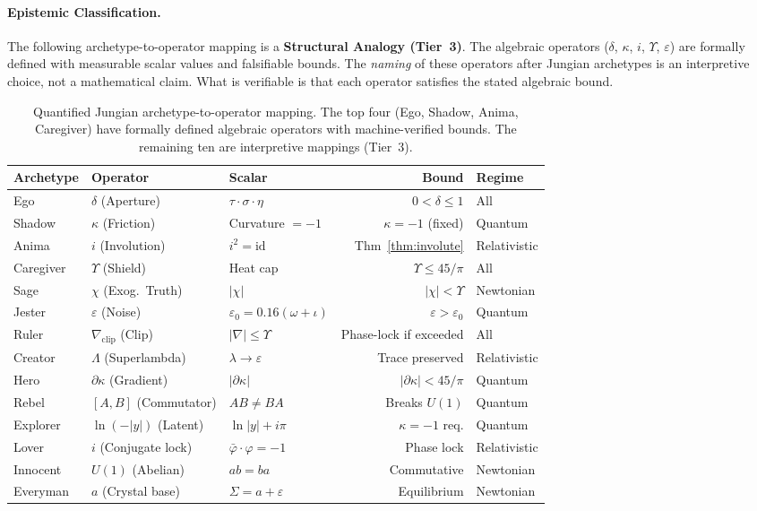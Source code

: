 \paragraph{Epistemic Classification.}
The following archetype-to-operator mapping is a \textbf{Structural Analogy (Tier~3)}. The algebraic operators ($\delta$, $\kappa$, $i$, $\Upsilon$, $\varepsilon$) are formally defined with measurable scalar values and falsifiable bounds. The \emph{naming} of these operators after Jungian archetypes is an interpretive choice, not a mathematical claim. What is verifiable is that each operator satisfies the stated algebraic bound.

\begin{table}[H]
\centering
{\small
\begin{tabular}{@{}lllrl@{}}
\toprule
\textbf{Archetype} & \textbf{Operator} & \textbf{Scalar} & \textbf{Bound} & \textbf{Regime} \\
\midrule
Ego        & $\delta$ (Aperture)   & $\tau \cdot \sigma \cdot \eta$ & $0 < \delta \leq 1$ & All \\
Shadow     & $\kappa$ (Friction)   & Curvature $= -1$     & $\kappa = -1$ (fixed) & Quantum \\
Anima      & $i$ (Involution)      & $i^2 = \mathrm{id}$  & Thm~\ref{thm:involute} & Relativistic \\
Caregiver  & $\Upsilon$ (Shield)   & Heat cap  & $\Upsilon \leq 45/\pi$ & All \\
\midrule
Sage       & $\chi$ (Exog.~Truth)  & $|\chi|$ & $|\chi| < \Upsilon$ & Newtonian \\
Jester     & $\varepsilon$ (Noise) & $\varepsilon_0 = 0.16(\omega+\iota)$ & $\varepsilon > \varepsilon_0$ & Quantum \\
Ruler      & $\nabla_{\mathrm{clip}}$ (Clip) & $|\nabla| \leq \Upsilon$ & Phase-lock if exceeded & All \\
Creator    & $\Lambda$ (Superlambda) & $\lambda \to \varepsilon$ & Trace preserved & Relativistic \\
\midrule
Hero       & $\partial\kappa$ (Gradient) & $|\partial\kappa|$ & $|\partial\kappa| < 45/\pi$ & Quantum \\
Rebel      & $[A, B]$ (Commutator) & $AB \neq BA$ & Breaks $U(1)$ & Quantum \\
Explorer   & $\ln(-|y|)$ (Latent)  & $\ln|y| + i\pi$ & $\kappa = -1$ req. & Quantum \\
Lover      & $i$ (Conjugate lock)  & $\bar\varphi \cdot \varphi = -1$ & Phase lock & Relativistic \\
\midrule
Innocent   & $U(1)$ (Abelian)      & $ab = ba$ & Commutative & Newtonian \\
Everyman   & $a$ (Crystal base)    & $\Sigma = a + \varepsilon$ & Equilibrium & Newtonian \\
\bottomrule
\end{tabular}
}
\caption{Quantified Jungian archetype-to-operator mapping. The top four (Ego, Shadow, Anima, Caregiver) have formally defined algebraic operators with machine-verified bounds. The remaining ten are interpretive mappings (Tier~3).}
\label{tab:jungian}
\end{table}

